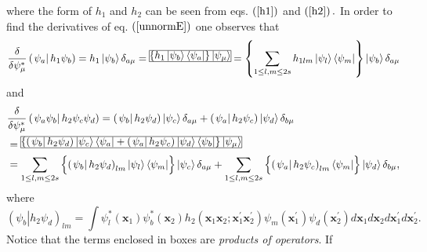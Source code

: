 \documentclass[aps,preprint]{revtex4}%
\begin{document}
where the form of $h_{1}$ and $h_{2}$ can be seen from eqs. $\left(
\ref{h1}\right)  $ and $\left(  \ref{h2}\right)  .$ In order to find the
derivatives of eq. $\left(  \ref{unnormE}\right)  $ one observes that
\begin{equation}
\frac{\delta}{\delta\psi_{\mu}^{\ast}}\left(  \left.  \psi_{a}\right\vert
h_{1}\psi_{b}\right)  =h_{1}\left\vert \psi_{b}\right\rangle \delta_{a\mu
}=\frame{$\left\{  h_1\left\vert \psi_b\right\rangle \left\langle
\psi_a\right\vert \right\}  \left\vert \psi_\mu\right\rangle $}=\left\{
\sum_{1\leq l,m\leq2s}h_{1lm}\left\vert \psi_{l}\right\rangle \left\langle
\psi_{m}\right\vert \right\}  \left\vert \psi_{b}\right\rangle \delta_{a\mu}%
\end{equation}
and
\begin{align}
&  \frac{\delta}{\delta\psi_{\mu}^{\ast}}\left(  \left.  \psi_{a}\psi
_{b}\right\vert h_{2}\psi_{c}\psi_{d}\right)  =\left(  \left.  \psi
_{b}\right\vert h_{2}\psi_{d}\right)  \left\vert \psi_{c}\right\rangle
\delta_{a\mu}+\left(  \left.  \psi_{a}\right\vert h_{2}\psi_{c}\right)
\left\vert \psi_{d}\right\rangle \delta_{b\mu}\nonumber\\
&  =\frame{$\left\{  \left(  \left.  \psi_b\right\vert h_2\psi_d\right)
\left\vert \psi_c\right\rangle \left\langle \psi_a\right\vert +\left(  \left.
\psi_a\right\vert h_2\psi_c\right)  \left\vert \psi_d\right\rangle
\left\langle \psi_b\right\vert \right\}  \left\vert \psi_\mu\right\rangle
$}\nonumber\\
&  =\sum_{1\leq l,m\leq2s}\left\{  \overset{}{\left(  \left.  \psi
_{b}\right\vert h_{2}\psi_{d}\right)  _{lm}\left\vert \psi_{l}\right\rangle
\left\langle \psi_{m}\right\vert }\right\}  \left\vert \psi_{c}\right\rangle
\delta_{a\mu}+\sum_{1\leq l,m\leq2s}\left\{  \overset{}{\left(  \left.
\psi_{a}\right\vert h_{2}\psi_{c}\right)  _{lm}\left\langle \psi
_{m}\right\vert }\right\}  \left\vert \psi_{d}\right\rangle \delta_{b\mu},
\end{align}
where
\begin{equation}
\left(  \left.  \psi_{b}\right\vert h_{2}\psi_{d}\right)  _{lm}=\int\psi
_{l}^{\ast}\left(  \mathbf{x}_{1}\right)  \psi_{b}^{\ast}\left(
\mathbf{x}_{2}\right)  h_{2}\left(  \mathbf{x}_{1}\mathbf{x}_{2}%
;\mathbf{x}_{1}^{\prime}\mathbf{x}_{2}^{\prime}\right)  \psi_{m}\left(
\mathbf{x}_{1}^{\prime}\right)  \psi_{d}\left(  \mathbf{x}_{2}^{\prime
}\right)  d\mathbf{x}_{1}d\mathbf{x}_{2}d\mathbf{x}_{1}^{\prime}%
d\mathbf{x}_{2}^{\prime}.
\end{equation}
Notice that the terms enclosed in boxes are \emph{products of operators}. If
\end{document}
